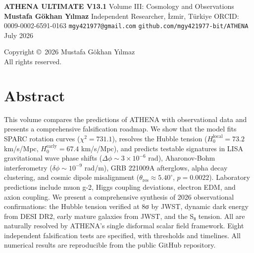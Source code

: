 \documentclass[12pt,oneside]{book}
\begin{document}
\frontmatter

\begin{titlepage}
\centering
\vspace*{1cm}
{\Huge\bfseries ATHENA ULTIMATE V13.1}
\vspace{0.5cm}
{\Large Volume III: Cosmology and Observations}
\vspace{2cm}
{\Large \textbf{Mustafa Gökhan Yılmaz}}
\vspace{0.3cm}
{\large Independent Researcher, İzmir, Türkiye}
\vspace{0.2cm}
{\large ORCID: 0009-0002-6591-0163}
\vspace{0.2cm}
{\large \texttt{mgy421977@gmail.com}}
\vspace{0.2cm}
{\large \texttt{github.com/mgy421977-bit/ATHENA}}
\vspace{2cm}
{\large July 2026}
\vfill
\end{titlepage}

\newpage
\thispagestyle{empty}
\vspace*{\fill}
\begin{center}
Copyright \copyright\ 2026 Mustafa Gökhan Yılmaz\\
All rights reserved.
\end{center}
\vspace*{\fill}

\chapter*{Abstract}

This volume compares the predictions of ATHENA with observational data and presents a comprehensive falsification roadmap. We show that the model fits SPARC rotation curves ($\chi^2 = 731.1$), resolves the Hubble tension ($H_0^{\text{local}} = 73.2$ km/s/Mpc, $H_0^{\text{early}} = 67.4$ km/s/Mpc), and predicts testable signatures in LISA gravitational wave phase shifts ($\Delta\phi \sim 3 \times 10^{-6}$ rad), Aharonov-Bohm interferometry ($\delta\phi \sim 10^{-9}$ rad/m), GRB 221009A afterglows, alpha decay clustering, and cosmic dipole misalignment ($\theta_{\text{res}} \approx 5.40^\circ$, $p = 0.0022$). Laboratory predictions include muon g-2, Higgs coupling deviations, electron EDM, and axion coupling. We present a comprehensive synthesis of 2026 observational confirmations: the Hubble tension verified at 8σ by JWST, dynamic dark energy from DESI DR2, early mature galaxies from JWST, and the S₈ tension. All are naturally resolved by ATHENA's single disformal scalar field framework. Eight independent falsification tests are specified, with thresholds and timelines. All numerical results are reproducible from the public GitHub repository.
\end{document}
